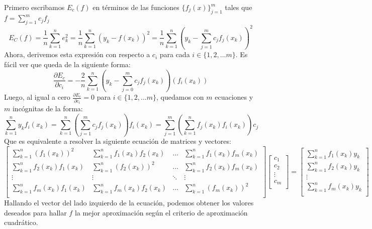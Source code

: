 Primero escribamos $E_c(f)$ en términos de las funciones $\{f_j(x)\}_{j=1}^m$ tales que $f=\sum_{j=1}^mc_jf_j$
$$E_C(f)=\frac{1}{n}\sum_{k=1}^ne_k^2=\frac{1}{n}\sum_{k=1}^n\left(y_k-f(x_k)\right)^2=\frac{1}{n}\sum_{k=1}^n\left(y_k-\sum_{j=1}^mc_jf_j(x_k)\right)^2$$
Ahora, derivemos esta expresión con respecto a $c_i$ para cada $i\in\{1,2,...m\}$. Es fácil ver que queda de la siguiente forma: 
$$\frac{\partial E_c}{\partial c_i}=-\frac{2}{n}\sum_{k=1}^n\left(y_k-\sum_{j=0}^mc_jf_j(x_k)\right)(f_i(x_k))$$
Luego, al igual a cero $\frac{\partial E_c}{\partial c_i}=0$ para $i\in\{1,2,...m\}$, quedamos con $m$ ecuaciones y $m$ incógnitas de la forma:
$$\sum_{k=1}^ny_kf_i(x_k)=\sum_{k=1}^n\left(\sum_{j=1}^mc_jf_j(x_k)\right)f_i(x_k)=\sum_{j=1}^m\left(\sum_{k=1}^nf_j(x_k)f_i(x_k)\right)c_j$$
Que es equivalente a resolver la siguiente ecuación de matrices y vectores:
$$
\begin{bmatrix}
    \sum_{k=1}^n(f_1(x_k))^2 & \sum_{k=1}^nf_1(x_k)f_2(x_k) & \dots & \sum_{k=1}^nf_1(x_k)f_m(x_k) \\
    \sum_{k=1}^nf_2(x_k)f_1(x_k) & \sum_{k=1}^n(f_2(x_k))^2 & \dots & \sum_{k=1}^nf_2(x_k)f_m(x_k) \\
    \vdots & \vdots & \ddots & \vdots\\
     \sum_{k=1}^nf_m(x_k)f_1(x_k) & \sum_{k=1}^nf_m(x_k)f_2(x_k) & \dots & \sum_{k=1}^n(f_m(x_k))^2 \\
\end{bmatrix}
\begin{bmatrix}
    c_1\\c_2\\\vdots\\c_m\\
\end{bmatrix}
=
\begin{bmatrix}
    \sum_{k=1}^n f_1(x_k)y_k\\\sum_{k=1}^n f_2(x_k)y_k\\\vdots\\\sum_{k=1}^n f_m(x_k)y_k\\
\end{bmatrix}
$$
Hallando el vector del lado izquierdo de la ecuación, podemos obtener los valores deseados para hallar $f$ la mejor aproximación según el criterio de aproximación cuadrático.
